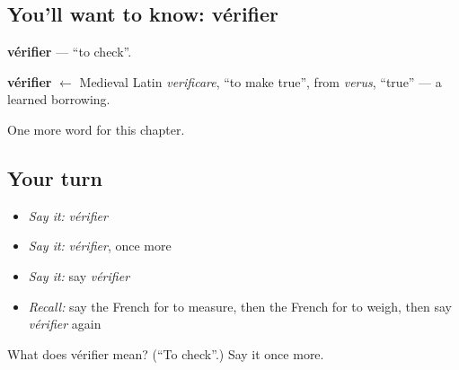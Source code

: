 \subsection*{You'll want to know: vérifier}
\textbf{vérifier} — \textquotedblleft{}to check\textquotedblright{}.

\begin{cousinweb}
\textbf{vérifier} $\leftarrow$ Medieval Latin \emph{verificare}, \textquotedblleft{}to make true\textquotedblright{}, from \emph{verus}, \textquotedblleft{}true\textquotedblright{} — a learned borrowing.
\end{cousinweb}

\begin{grammarlens}[title={What you've built}]
One more word for this chapter.
\end{grammarlens}

\subsection*{Your turn}
\begin{itemize}
\raggedright
  \item \emph{Say it:} \emph{vérifier}
  \item \emph{Say it:} \emph{vérifier}, once more
  \item \emph{Say it:} say \emph{vérifier}
  \item \emph{Recall:} say the French for to measure, then the French for to weigh, then say \emph{vérifier} again
\end{itemize}

\begin{tcolorbox}[breakable,colback=teal!4,colframe=teal!35!black,title={Before you move on}]
What does vérifier mean? (\textquotedblleft{}To check\textquotedblright{}.) Say it once more.
\end{tcolorbox}
